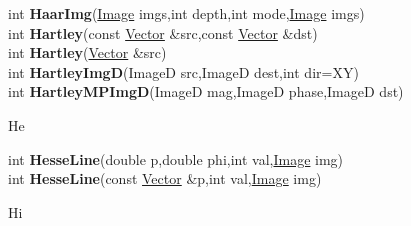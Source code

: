 \documentclass[10pt,titlepage]{article}
\def\functionlistentry#1#2#3#4#5#6{\noindent #1 {\bf #2}(#3) \dotfill #6\\}
\def\letterref#1{}
\def\letterlabel#1{\vspace{0.5cm}\centerline{\Large #1}}
\def\letterlabelend#1{}
\begin{document}
{{\letterref{Ha}
\letterref{He}
\letterref{Hi}
\letterref{Hs}
\letterref{Hu}
\letterlabelend{Ha}
\functionlistentry{int}{HaarImg}{\hyperlink{Image}{Image} imgs,int depth,int mode,\hyperlink{Image}{Image} imgs}{1229}{signalTrafo}{}
\functionlistentry{int}{Hartley}{const \hyperlink{Vector}{Vector} \&src,const \hyperlink{Vector}{Vector} \&dst}{1198}{signalTrafo}{}
\functionlistentry{int}{Hartley}{\hyperlink{Vector}{Vector} \&src}{1199}{signalTrafo}{}
\functionlistentry{int}{HartleyImgD}{ImageD src,ImageD dest,int dir=XY}{1201}{signalTrafo}{}
\functionlistentry{int}{HartleyMPImgD}{ImageD mag,ImageD phase,ImageD dst}{1209}{signalTrafo}{}

\letterlabel{He}
\letterref{A}
\letterref{B}
\letterref{C}
\letterref{D}
\letterref{E}
\letterref{F}
\letterref{G}
\letterref{H}
\letterref{I}
\letterref{K}
\letterref{L}
\letterref{M}
\letterref{N}
\letterref{O}
\letterref{P}
\letterref{Q}
\letterref{R}
\letterref{S}
\letterref{T}
\letterref{U}
\letterref{V}
\letterref{W}
\letterref{X}
\letterref{Y}
\letterref{Z}

\letterref{Ha}
\letterref{He}
\letterref{Hi}
\letterref{Hs}
\letterref{Hu}
\letterlabelend{He}
\functionlistentry{int}{HesseLine}{double p,double phi,int val,\hyperlink{Image}{Image} img}{1323}{graphics}{}
\functionlistentry{int}{HesseLine}{const \hyperlink{Vector}{Vector} \&p,int val,\hyperlink{Image}{Image} img}{1324}{graphics}{}

\letterlabel{Hi}
\letterref{A}
\letterref{B}
\letterref{C}
\letterref{D}
\letterref{E}
\letterref{F}
\letterref{G}
\letterref{H}
\letterref{I}
\letterref{K}
\letterref{L}
\letterref{M}
\letterref{N}
\letterref{O}
\letterref{P}
\letterref{Q}
\letterref{R}
\letterref{S}
\letterref{T}
\letterref{U}
\letterref{V}
\letterref{W}
\letterref{X}
\letterref{Y}
\letterref{Z}

}}
\end{document}
